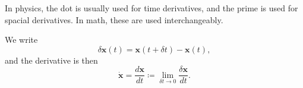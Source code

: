 \begin{example}
    In physics, the dot is usually used for time derivatives, and the prime is used for spacial derivatives. In math, these are used interchangeably.

    We write
    \[
        \delta \mathbf{x} (t) = \mathbf{x} (t + \delta t) - \mathbf{x} (t),
    \]
    and the derivative is then
    \[
        \dot{\mathbf{x}} = \frac{d \mathbf{x} }{dt}\coloneqq \lim\limits_{\delta t \to 0} \frac{\delta \mathbf{x}}{dt}.
    \]
\end{example}